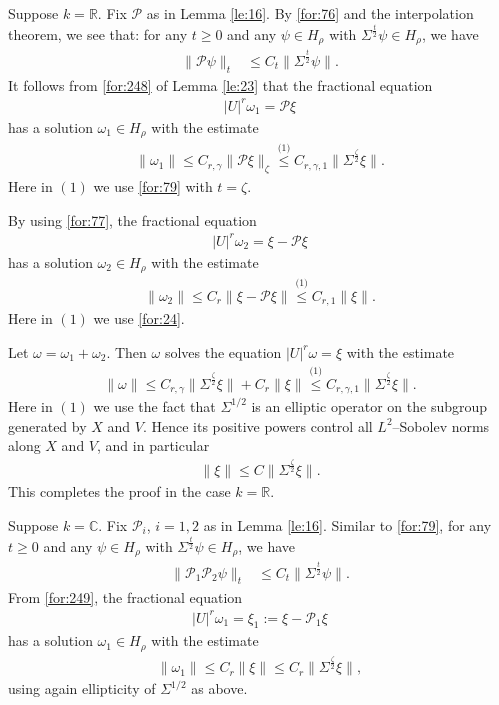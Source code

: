 \documentclass[11 pt]{amsart}
\newcommand{\RR}{\mathbb{R}}
\newcommand{\CC}{\mathbb{C}}
\newcommand{\norm}[1]{\lVert#1\rVert}
\theoremstyle{definition}
\numberwithin{equation}{section}
\begin{document}
Suppose $k=\RR$.  Fix $\mathcal{P}$ as in Lemma \ref{le:16}. By \eqref{for:76} and the interpolation theorem, we see that: for any $t\geq0$ and any  $\psi\in H_\rho$ with $\Sigma^{\frac{t}{2}}\psi\in H_\rho$,  we have
\begin{align}\label{for:79}
 \norm{\mathcal{P}\psi}_{t}&\leq C_{t}\big\|\Sigma^{\frac{t}{2}}\psi\big\|.
\end{align}
It follows from \eqref{for:248} of Lemma \ref{le:23} that  the fractional equation
\begin{align*}
    |U|^r\omega_1=\mathcal{P}\xi
  \end{align*}
  has a solution $\omega_1\in H_\rho$ with the estimate
  \begin{align*}
 \norm{\omega_1}\leq C_{r,\gamma}\big\|\mathcal{P}\xi\big\|_{\zeta}\overset{\text{(1)}}{\leq} C_{r,\gamma,1}\big\|\Sigma^{\frac{\zeta}{2}}\xi\big\|.
\end{align*}
Here in $(1)$ we use \eqref{for:79} with $t=\zeta$.

By using \eqref{for:77}, the fractional equation
\begin{align*}
    |U|^r\omega_2=\xi-\mathcal{P}\xi
  \end{align*}
  has a solution $\omega_2\in H_\rho$ with the estimate
  \begin{align*}
 \norm{\omega_2}\leq C_{r}\norm{\xi-\mathcal{P}\xi}\overset{\text{(1)}}{\leq}C_{r,1}\norm{\xi}.
\end{align*}
Here in $(1)$ we use \eqref{for:24}.


Let $\omega=\omega_1+\omega_2$. Then $\omega$ solves the equation $|U|^r\omega=\xi$ with the estimate
 \begin{align*}
 \norm{\omega}\leq C_{r,\gamma}\big\|\Sigma^{\frac{\zeta}{2}}\xi\big\|+C_{r}\norm{\xi}\overset{\text{(1)}}{\leq} C_{r,\gamma,1}\big\|\Sigma^{\frac{\zeta}{2}}\xi\big\|.
\end{align*}
Here in $(1)$ we use the fact that $\Sigma^{1/2}$ is an elliptic operator on the subgroup generated by $X$ and $V$. Hence its positive powers control all
$L^2$–Sobolev norms along $X$ and $V$, and in particular
\begin{align*}
\norm{\xi}\leq C\big\|\Sigma^{\frac{\zeta}{2}}\xi\big\|.
\end{align*}
This completes the proof in the case $k=\RR$.

Suppose $k=\CC$.  Fix $\mathcal{P}_i$, $i=1,2$ as in Lemma \ref{le:16}. Similar to \eqref{for:79}, for any $t\geq0$ and any  $\psi\in H_\rho$ with $\Sigma^{\frac{t}{2}}\psi\in H_\rho$,  we have
\begin{align}\label{for:254}
 \norm{\mathcal{P}_1\mathcal{P}_2\psi}_{t}&\leq C_{t}\big\|\Sigma^{\frac{t}{2}}\psi\big\|.
\end{align}
From \eqref{for:249}, the fractional equation
\begin{align}\label{for:271}
    |U|^r\omega_{1}=\xi_1:=\xi-\mathcal{P}_1\xi
  \end{align}
  has a solution $\omega_1\in H_\rho$ with the estimate
  \begin{align*}
 \norm{\omega_{1}}\leq C_{r}\norm{\xi}\leq C_{r}\big\|\Sigma^{\frac{\zeta}{2}}\xi\big\|,
\end{align*}
using again ellipticity of $\Sigma^{1/2}$ as above.
\end{document}
